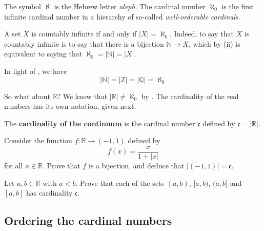 The symbol $\aleph$ is the Hebrew letter \textit{aleph}. The cardinal number $\aleph_0$ is the first infinite cardinal number in a hierarchy of so-called \textit{well-orderable cardinals}.

\begin{example}
\label{exCountablyInfiniteIfAndOnlyIfCardinalityAlephNought}
A set $X$ is countably infinite if and only if $|X| = \aleph_0$. Indeed, to say that $X$ is countably infinite is to say that there is a bijection $\mathbb{N} \to X$, which by (ii) is equivalent to saying that $\aleph_0 = |\mathbb{N}| = |X|$.
\end{example}

In light of , we have
\[ |\mathbb{N}| = |\mathbb{Z}| = |\mathbb{Q}| = \aleph_0 \]

So what about $\mathbb{R}$? We know that $|\mathbb{R}| \ne \aleph_0$ by . The cardinality of the real numbers has its own notation, given next.

\begin{definition}
\label{defCardinalityOfContinuum}
The \textbf{cardinality of the continuum} is the cardinal number $\mathfrak{c}$  defined by $\mathfrak{c} = |\mathbb{R}|$.
\end{definition}

\begin{exercise}
\label{exIntervalFromMinusOneToOneHasCardinalityOfContinuum}
Consider the function $f : \mathbb{R} \to (-1,1)$ defined by
\[ f(x) = \dfrac{x}{1+|x|} \]
for all $x \in \mathbb{R}$. Prove that $f$ is a bijection, and deduce that $|(-1,1)| = \mathfrak{c}$.
\end{exercise}

\begin{exercise}
\label{exRealsHaveSameCardinalityAsIntervals}
Let $a,b \in \mathbb{R}$ with $a<b$. Prove that each of the sets $(a,b)$, $[a,b)$, $(a,b]$ and $[a,b]$ has cardinality $\mathfrak{c}$.
\end{exercise}

\subsection*{Ordering the cardinal numbers}

